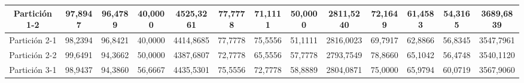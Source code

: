 \documentclass[12pt]{article}
\begin{document}
\begin{table}[H]
{\begin{tabular}{|c|cccc|cccc|cccc|}
Partición 1-2 & \multicolumn{1}{c|}{97,8947}                                                  & \multicolumn{1}{c|}{96,4789}                                                 & \multicolumn{1}{c|}{40,0000} & 4525,3261 & \multicolumn{1}{c|}{77,7778}                                                  & \multicolumn{1}{c|}{71,1111}                                                 & \multicolumn{1}{c|}{50,0000} & 2811,5240 & \multicolumn{1}{c|}{72,1649}                                                  & \multicolumn{1}{c|}{61,4583}                                                 & \multicolumn{1}{c|}{54,3165} & 3689,6839 \\ \hline
Partición 2-1 & \multicolumn{1}{c|}{98,2394}                                                  & \multicolumn{1}{c|}{96,8421}                                                 & \multicolumn{1}{c|}{40,0000} & 4414,8685 & \multicolumn{1}{c|}{77,7778}                                                  & \multicolumn{1}{c|}{75,5556}                                                 & \multicolumn{1}{c|}{51,1111} & 2816,0023 & \multicolumn{1}{c|}{69,7917}                                                  & \multicolumn{1}{c|}{62,8866}                                                 & \multicolumn{1}{c|}{56,8345} & 3547,7961 \\ \hline
Partición 2-2 & \multicolumn{1}{c|}{99,6491}                                                  & \multicolumn{1}{c|}{94,3662}                                                 & \multicolumn{1}{c|}{50,0000} & 4387,6807 & \multicolumn{1}{c|}{72,7778}                                                  & \multicolumn{1}{c|}{65,5556}                                                 & \multicolumn{1}{c|}{57,7778} & 2793,7549 & \multicolumn{1}{c|}{78,8660}                                                  & \multicolumn{1}{c|}{65,1042}                                                 & \multicolumn{1}{c|}{56,4748} & 3540,1120 \\ \hline
Partición 3-1 & \multicolumn{1}{c|}{98,9437}                                                  & \multicolumn{1}{c|}{94,3860}                                                 & \multicolumn{1}{c|}{56,6667} & 4435,5301 & \multicolumn{1}{c|}{75,5556}                                                  & \multicolumn{1}{c|}{72,7778}                                                 & \multicolumn{1}{c|}{58,8889} & 2804,0871 & \multicolumn{1}{c|}{75,0000}                                                  & \multicolumn{1}{c|}{65,9794}                                                 & \multicolumn{1}{c|}{60,0719} & 3567,9060 \\ \hline

\end{tabular}}
\end{table}
\end{document}
